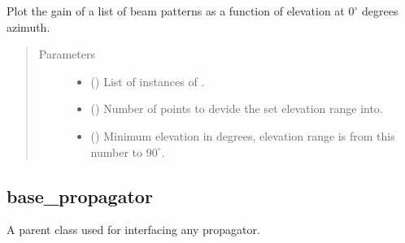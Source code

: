 \documentclass[letterpaper,10pt,english]{sphinxmanual}
\begin{document}
\begin{fulllineitems}
\label{\detokenize{modules/antenna:antenna.plot_gains}}
Plot the gain of a list of beam patterns as a function of elevation at \(0^\circ\) degrees azimuth.
\begin{quote}\begin{description}
\item[{Parameters}] \leavevmode\begin{itemize}
\item {} 
 () \textendash{} List of instances of {\hyperref[\detokenize{modules/antenna:antenna.BeamPattern}]{}}.

\item {} 
 () \textendash{} Number of points to devide the set elevation range into.

\item {} 
 () \textendash{} Minimum elevation in degrees, elevation range is from this number to \(90^\circ\).

\end{itemize}

\end{description}\end{quote}

\end{fulllineitems}



\subsection{base\_propagator}
\label{\detokenize{modules/propagator_base:module-propagator_base}}\label{\detokenize{modules/propagator_base:base-propagator}}\label{\detokenize{modules/propagator_base::doc}}
A parent class used for interfacing any propagator.
\end{document}
